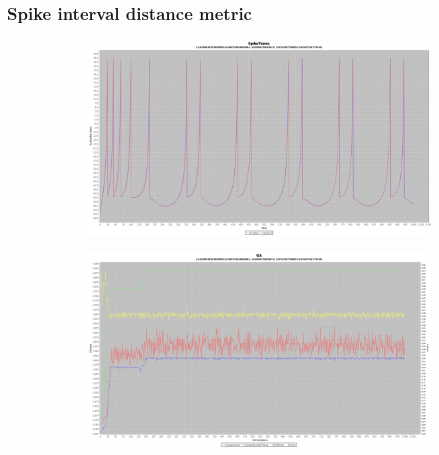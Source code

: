 \documentclass[10pt]{article}
\begin{document}
		\subsubsection{Spike interval distance metric}
			\begin{figure}[H]
				\centering
					\begin{subfigure}{.5\textwidth}
						\centering
						\includegraphics[width=\linewidth]{./../images/izzy2/interval/plot.png}
						
						\label{fig:sub5a}
					\end{subfigure}%
					\begin{subfigure}{.5\textwidth}
						\centering
						\includegraphics[width=\linewidth]{./../images/izzy2/interval/prog.png}
						
						\label{fig:sub5b}
					\end{subfigure}
					
					\label{fig:plot5}
			\end{figure}
			
\end{document}
